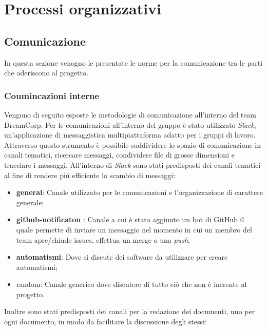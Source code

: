 \section{Processi organizzativi}
    \subsection{Comunicazione}
        In questa sezione venogno le presentate le norme per la comunicazione tra le parti che aderiscono al progetto.
        \subsubsection{Coumincazioni interne}
            Vengono di seguito esposte le metodologie di comunicazione all'interno del team DreamCorp.
            \newline
            Per le comunicazioni all'interno del gruppo è stato utilizzato \textit{Slack}, un'applicazione di messaggistica multipiattaforma adatto per i gruppi di lavoro. Attraverso questo strumento è possibile suddividere lo spazio di comunicazione in canali tematici, ricercare messaggi, condividere file di grosse dimensioni e tracciare i messaggi.
            \newline
            All'interno di \textit{Slack} sono stati predisposti dei canali tematici al fine di rendere più efficiente lo scambio di messaggi:
            \begin{itemize}
                \item \textbf{general}: Canale utilizzato per le comunicazioni e l'organizzazione di carattere generale;
                \item \textbf{github-notificaton} : Canale a cui è stato aggiunto un bot di GitHub il quale permette di inviare un messaggio nel momento in cui un membro del team apre/chiude issues, effettua un merge o una \textit{push};
                \item \textbf{automatismi}: Dove si discute dei software da utilizzare per creare automatismi;
                \item{random}: Canale generico dove discutere di tutto ciò che non è inerente al progetto.    
            \end{itemize}
            \newline
            Inoltre sono stati predisposti dei canali per la redazione dei documenti, uno per ogni documento, in modo da facilitare la discussione degli stessi:
